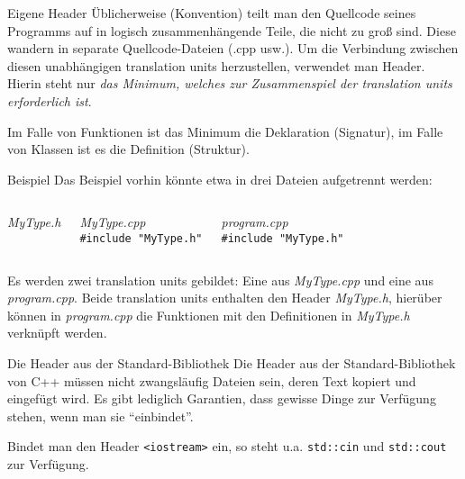 \begin{frame}{Eigene Header}
	Üblicherweise (Konvention) teilt man den Quellcode seines Programms auf in logisch zusammenhängende Teile, die nicht zu groß sind. Diese wandern in separate Quellcode-Dateien (.cpp usw.). Um die Verbindung zwischen diesen unabhängigen translation units herzustellen, verwendet man Header. Hierin steht nur \emph{das Minimum, welches zur Zusammenspiel der translation units erforderlich ist}.
	
	\pause
	\vspace{1em}
	
	Im Falle von Funktionen ist das Minimum die Deklaration (Signatur), im Falle von Klassen ist es die Definition (Struktur).
\end{frame}

\begin{frame}[fragile]{Beispiel}
	Das Beispiel vorhin könnte etwa in drei Dateien aufgetrennt werden:
	\vspace{1em}
	
	\scriptsize
	\begin{columns}[t]
		\emph{MyType.h}
		
		
		\emph{MyType.cpp}\\
		\vspace{0.75em}
		\verb|#include "MyType.h"|
		
		
		\emph{program.cpp}\\
		\vspace{0.75em}
		\verb|#include "MyType.h"|
		
	\end{columns}
	
	\vspace{1em}
	\normalsize
	Es werden zwei translation units gebildet: Eine aus \emph{MyType.cpp} und eine aus \emph{program.cpp}. Beide translation units enthalten den Header \emph{MyType.h}, hierüber können in \emph{program.cpp} die Funktionen mit den Definitionen in \emph{MyType.h} verknüpft werden.
\end{frame}

\begin{frame}[fragile]{Die Header aus der Standard-Bibliothek}
	Die Header aus der Standard-Bibliothek von C++ müssen nicht zwangsläufig Dateien sein, deren Text kopiert und eingefügt wird. Es gibt lediglich Garantien, dass gewisse Dinge zur Verfügung stehen, wenn man sie \enquote{einbindet}.
	
	\pause
	\vspace{1em}
	
	Bindet man den Header \verb|<iostream>| ein, so steht u.a. \verb|std::cin| und \verb|std::cout| zur Verfügung.
\end{frame}

